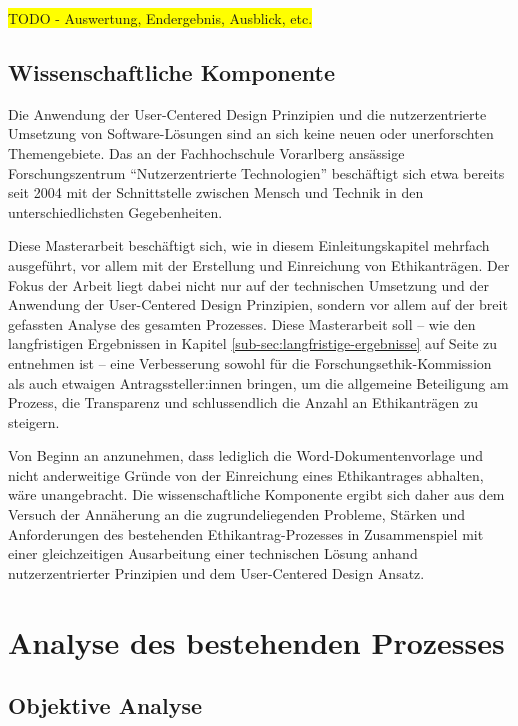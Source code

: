 \colorbox{yellow}{TODO - Auswertung, Endergebnis, Ausblick, etc.}

\section{Wissenschaftliche Komponente}
\label{sec:wissenschaftliche-komponente}

Die Anwendung der User-Centered Design Prinzipien und die nutzerzentrierte Umsetzung von Software-Lösungen sind an sich keine neuen oder unerforschten Themengebiete. Das an der Fachhochschule Vorarlberg ansässige Forschungszentrum \enquote{Nutzerzentrierte Technologien} beschäftigt sich etwa bereits seit 2004 mit der Schnittstelle zwischen Mensch und Technik in den unterschiedlichsten Gegebenheiten.\cite{fachhochschule_vorarlberg_gmbh_nutzerzentrierte_2021}

Diese Masterarbeit beschäftigt sich, wie in diesem Einleitungskapitel mehrfach ausgeführt, vor allem mit der Erstellung und Einreichung von Ethikanträgen. Der Fokus der Arbeit liegt dabei nicht nur auf der technischen Umsetzung und der Anwendung der User-Centered Design Prinzipien, sondern vor allem auf der breit gefassten Analyse des gesamten Prozesses. Diese Masterarbeit soll -- wie den langfristigen Ergebnissen in Kapitel \ref{sub-sec:langfristige-ergebnisse} auf Seite \pageref{sub-sec:langfristige-ergebnisse} zu entnehmen ist -- eine Verbesserung sowohl für die Forschungsethik-Kommission als auch etwaigen Antragssteller:innen bringen, um die allgemeine Beteiligung am Prozess, die Transparenz und schlussendlich die Anzahl an Ethikanträgen zu steigern.

Von Beginn an anzunehmen, dass lediglich die Word-Dokumentenvorlage und nicht anderweitige Gründe von der Einreichung eines Ethikantrages abhalten, wäre unangebracht. Die wissenschaftliche Komponente ergibt sich daher aus dem Versuch der Annäherung an die zugrundeliegenden Probleme, Stärken und Anforderungen des bestehenden Ethikantrag-Prozesses in Zusammenspiel mit einer gleichzeitigen Ausarbeitung einer technischen Lösung anhand nutzerzentrierter Prinzipien und dem User-Centered Design Ansatz.

\chapter{Analyse des bestehenden Prozesses}
\label{chap:analyse-bestehender-prozess}

\section{Objektive Analyse}

